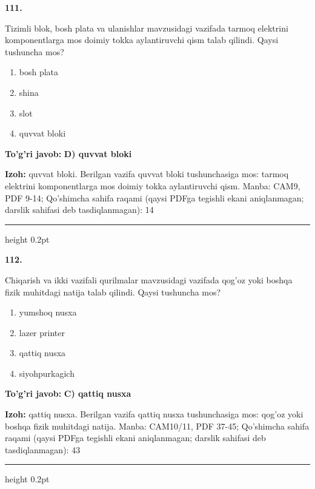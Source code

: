 \documentclass[10pt,a4paper]{article}
\begin{document}
{\bfseries\sffamily\color{ink} 111.}
\par
Tizimli blok, bosh plata va ulanishlar mavzusidagi vazifada tarmoq elektrini komponentlarga mos doimiy tokka aylantiruvchi qism talab qilindi. Qaysi tushuncha mos?
\begin{enumerate}[label=\Alph*),leftmargin=9mm]
\item bosh plata
\item shina
\item slot
\item quvvat bloki
\end{enumerate}
\begin{tcolorbox}[enhanced,breakable,colback=teal!4,colframe=teal!60!black,boxrule=0.45pt,arc=1.2mm,left=2.7mm,right=2.7mm,top=1.8mm,bottom=1.8mm,before skip=2mm,after skip=2mm]
{\bfseries\sffamily\color{teal}To'g'ri javob:} \textbf{D) quvvat bloki}
\par\smallskip
{\bfseries Izoh:} quvvat bloki. Berilgan vazifa quvvat bloki tushunchasiga mos: tarmoq elektrini komponentlarga mos doimiy tokka aylantiruvchi qism. Manba: CAM9, PDF 9-14; Qo'shimcha sahifa raqami (qaysi PDFga tegishli ekani aniqlanmagan; darslik sahifasi deb tasdiqlanmagan): 14
\end{tcolorbox}
\vspace{2mm}\hrule height 0.2pt\vspace{3mm}

{\bfseries\sffamily\color{ink} 112.}
\par
Chiqarish va ikki vazifali qurilmalar mavzusidagi vazifada qog'oz yoki boshqa fizik muhitdagi natija talab qilindi. Qaysi tushuncha mos?
\begin{enumerate}[label=\Alph*),leftmargin=9mm]
\item yumshoq nusxa
\item lazer printer
\item qattiq nusxa
\item siyohpurkagich
\end{enumerate}
\begin{tcolorbox}[enhanced,breakable,colback=teal!4,colframe=teal!60!black,boxrule=0.45pt,arc=1.2mm,left=2.7mm,right=2.7mm,top=1.8mm,bottom=1.8mm,before skip=2mm,after skip=2mm]
{\bfseries\sffamily\color{teal}To'g'ri javob:} \textbf{C) qattiq nusxa}
\par\smallskip
{\bfseries Izoh:} qattiq nusxa. Berilgan vazifa qattiq nusxa tushunchasiga mos: qog'oz yoki boshqa fizik muhitdagi natija. Manba: CAM10/11, PDF 37-45; Qo'shimcha sahifa raqami (qaysi PDFga tegishli ekani aniqlanmagan; darslik sahifasi deb tasdiqlanmagan): 43
\end{tcolorbox}
\vspace{2mm}\hrule height 0.2pt\vspace{3mm}
\end{document}
